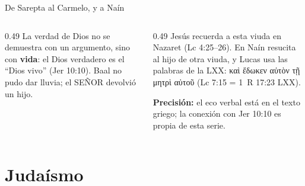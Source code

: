 \documentclass[hyperref={bookmarks=false},aspectratio=169]{beamer}
\newcommand{\grc}[1]{\foreignlanguage{ancientgreek}{#1}}
\newcommand{\SENOR}{S{\fontsize{0.78em}{1em}\selectfont EÑOR}}
\newcommand{\destacar}[1]{\textbf{\textcolor{azul}{#1}}}
\newcommand{\precision}[1]{{\footnotesize\color{gris}\textbf{Precisión:} #1}}
\begin{document}
\begin{frame}{De Sarepta al Carmelo, y a Naín}
\centering
{}\par\medskip
\begin{columns}[t,onlytextwidth]
\begin{column}{0.49\textwidth}\small
La verdad de Dios no se demuestra con un argumento, sino con \destacar{vida}: el Dios verdadero es el ``Dios vivo'' (Jer 10:10). Baal no pudo dar lluvia; el \SENOR{} devolvió un hijo.
\end{column}
\begin{column}{0.49\textwidth}\scriptsize
Jesús recuerda a esta viuda en Nazaret (Lc 4:25--26). En Naín resucita al hijo de otra viuda, y Lucas usa las palabras de la LXX: \grc{καὶ ἔδωκεν αὐτὸν τῇ μητρὶ αὐτοῦ} (Lc 7:15 = 1~R 17:23 LXX).\par\smallskip
\precision{el eco verbal está en el texto griego; la conexión con Jer 10:10 es propia de esta serie.}
\end{column}
\end{columns}
\end{frame}

\section{Judaísmo}
\end{document}
